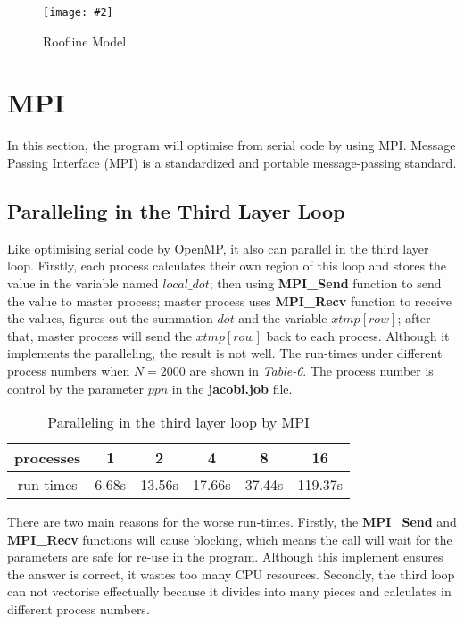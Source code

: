\documentclass[10pt, a4paper]{article}
\newcommand{\figuremacro}[5]{
    \begin{figure}[#1]
        \centering
        \texttt{[image: \#2]}
        \caption[#3]{\textbf{#3}#4}
        \label{fig:#2}
    \end{figure}
}
\begin{document}
	\figuremacro{h}{figure6}{}{ Roofline Model }{1.0}

	
	
	\section{MPI}
	
    In this section, the program will optimise from serial code by using MPI. Message Passing Interface (MPI) is a standardized and portable message-passing standard.
	
	\subsection{Paralleling in the Third Layer Loop}
	
    Like optimising serial code by OpenMP, it also can parallel in the third layer loop. Firstly, each process calculates their own region of this loop and stores the value in the variable named $local\_dot$; then using \textbf{MPI\_Send} function to send the value to master process; master process uses \textbf{MPI\_Recv} function to receive the values, figures out the summation $dot$ and the variable $xtmp[row]$; after that, master process will send the $xtmp[row]$ back to each process. Although it implements the paralleling, the result is not well. The run-times under different process numbers when $N=2000$ are shown in \textit{Table-6}. The process number is control by the parameter $ppn$ in the \textbf{jacobi.job} file.
	
	\begin{table}[h!]
    \centering
    \begin{tabular}{ |c|c|c|c|c|c| } 
     \hline
     processes  & 1 & 2 & 4 & 8 & 16 \\ \hline
     run-times  & 6.68s & 13.56s & 17.66s & 37.44s & 119.37s \\ \hline
    \end{tabular}
    \caption{Paralleling in the third layer loop by MPI }
    \end{table}
    
    There are two main reasons for the worse run-times. Firstly, the \textbf{MPI\_Send} and \textbf{MPI\_Recv} functions will cause blocking, which means the call will wait for the parameters are safe for re-use in the program. Although this implement ensures the answer is correct, it wastes too many CPU resources. Secondly, the third loop can not vectorise effectually because it divides into many pieces and calculates in different process numbers.
    
\end{document}
